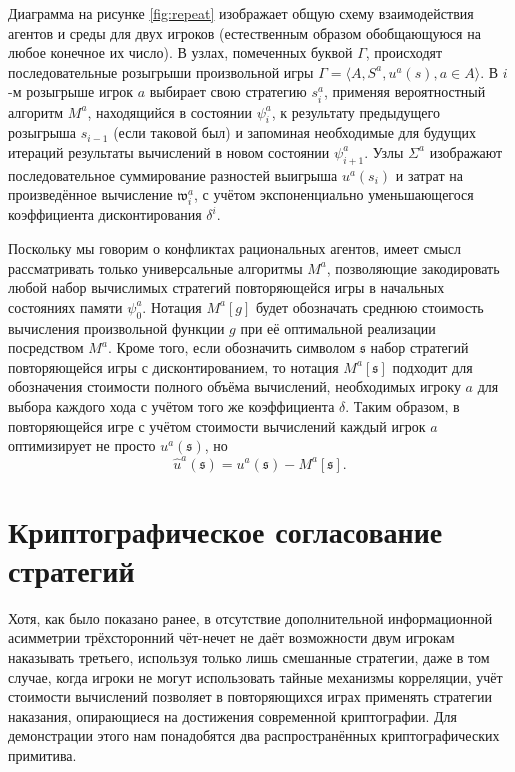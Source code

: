 Диаграмма на рисунке \ref{fig:repeat} изображает общую схему взаимодействия агентов и среды для двух игроков (естественным образом обобщающуюся на любое конечное их число). В узлах, помеченных буквой $\Gamma$, происходят последовательные розыгрыши произвольной игры $\Gamma = \langle A, S^a, u^a(s), a \in A \rangle$. В $i$-м розыгрыше игрок $a$ выбирает свою стратегию $s^a_i$, применяя вероятностный алгоритм $M^a$, находящийся в состоянии $\psi^a_i$, к результату предыдущего розыгрыша $s_{i-1}$ (если таковой был) и запоминая необходимые для будущих итераций результаты вычислений в новом состоянии $\psi^a_{i+1}$. Узлы $\Sigma^a$ изображают последовательное суммирование разностей выигрыша $u^a(s_i)$ и затрат на произведённое вычисление $\mathfrak{w}^a_i$, с учётом экспоненциально уменьшающегося коэффициента дисконтирования $\delta^i$.

Поскольку мы говорим о конфликтах рациональных агентов, имеет смысл рассматривать только универсальные алгоритмы $M^a$, позволяющие закодировать любой набор вычислимых стратегий повторяющейся игры в начальных состояниях памяти $\psi^a_0$. Нотация $M^a[g]$ будет обозначать среднюю стоимость вычисления произвольной функции $g$ при её оптимальной реализации посредством $M^a$. Кроме того, если обозначить символом $\mathfrak{s}$ набор стратегий повторяющейся игры с дисконтированием, то нотация $M^a[\mathfrak{s}]$ подходит для обозначения стоимости полного объёма вычислений, необходимых игроку $a$ для выбора каждого хода с учётом того же коэффициента $\delta$. Таким образом, в повторяющейся игре с учётом стоимости вычислений каждый игрок $a$ оптимизирует не просто $u^a(\mathfrak{s})$, но
\begin{equation*}
	\hat{u}^a(\mathfrak{s}) = u^a(\mathfrak{s}) - M^a[\mathfrak{s}].	
\end{equation*}

\section{Криптографическое согласование стратегий}\label{sec:ch3/sect4}

Хотя, как было показано ранее, в отсутствие дополнительной информационной асимметрии трёхсторонний чёт-нечет не даёт возможности двум игрокам наказывать третьего, используя только лишь смешанные стратегии, даже в том случае, когда игроки не могут использовать тайные механизмы корреляции, учёт стоимости вычислений позволяет в повторяющихся играх применять стратегии наказания, опирающиеся на достижения современной криптографии. Для демонстрации этого нам понадобятся два распространённых криптографических примитива.

